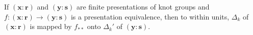 If $(\mathbf{x} : \mathbf{r})$ and $(\mathbf{y} : \mathbf{s})$ are finite presentations of knot groups and $f: (\mathbf{x} : \mathbf{r}) \to (\mathbf{y} : \mathbf{s})$ is a presentation equivalence, then to within units, $\Delta_k$ of $(\mathbf{x} : \mathbf{r})$ is mapped by $f_{**}$ onto $\Delta_k'$ of $(\mathbf{y} : \mathbf{s})$.
